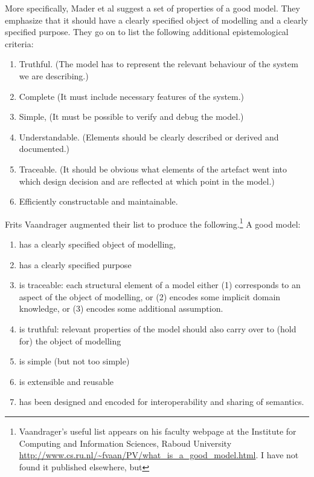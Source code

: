 More specifically, Mader et al \cite{maderConstructionVerificationModels2007} suggest a set of properties of a good model. They emphasize that it should have a clearly specified object of modelling and  a clearly specified purpose. They go on to list the  following additional epistemological criteria:
\begin{enumerate}   
\item  Truthful. (The model has to represent the relevant behaviour of the system we are describing.) 
\item  Complete (It must include necessary features of the system.)
\item Simple,  (It must be possible to verify and debug the model.)
\item Understandable. (Elements should be clearly described or derived and documented.)
\item  Traceable.  (It should be obvious what elements of the artefact went into which design decision and are reflected at which point in the model.)
\item  Efficiently constructable and maintainable. 
\end{enumerate}

Frits Vaandrager %
augmented their list to produce the following.\footnote{Vaandrager's useful list appears on his faculty webpage at the Institute for Computing and Information Sciences, Raboud University \url{http://www.cs.ru.nl/~fvaan/PV/what_is_a_good_model.html}. I have not found it published elsewhere, but  } A good model: \begin{enumerate}
     \item has a clearly specified object of modelling,
     \item  has a clearly specified purpose
     \item is traceable: each structural element of a model either (1) corresponds to an aspect of the object of modelling, or (2) encodes some implicit domain knowledge, or (3) encodes some additional assumption.
     \item  is truthful: relevant properties of the model should also carry over to (hold for) the object of modelling
     \item is simple (but not too simple)
     \item is extensible and reusable
     \item has been designed and encoded for interoperability and sharing of semantics.
 \end{enumerate}

